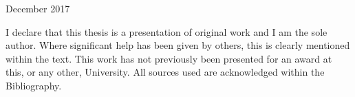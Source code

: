 \documentclass[
12pt, %
english, %
onehalfspacing, %
parskip, %
headsepline, %
]{MastersDoctoralThesis} %
\author{Kiri Amabel Thornalley} %
\begin{document}
\frontmatter %

\pagestyle{plain} %


\begin{titlepage}
\begin{center}

\LARGE\textbf{\ttitle}\\[3.5cm] 
\Large \authorname\\[2.5cm] 
 
\large \degreename\\[0.5cm] %
\univname \\ [0.5cm]
\deptname\\[2.5cm] %
 
\Large December 2017 \\[4cm] %

 
\vfill
\end{center}
\end{titlepage}


\begin{declaration}
\addchaptertocentry{\authorshipname}
\raggedright
I declare that this thesis is a presentation of original work and I am the sole author. 
\newline
Where significant help has been given by others, this is clearly mentioned within the text. 
\newline
This work has not previously been presented for an award at this, or any other, University.
\newline
All sources used are acknowledged within the Bibliography.


\end{declaration}

\cleardoublepage

\end{document}
